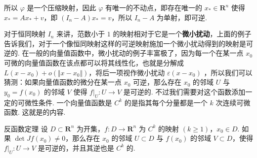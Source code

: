 所以 $\varphi$ 是一个压缩映射，因此 $\varphi$ 有唯一的不动点，即存在唯一的 $x_*\in \mathbf{R}^n$ 使得 $x_* = Ax_* + v$，即 $(I_n - A)x_* = v$，所以 $I_n - A$ 为单射，即可逆.

对于恒同映射 $I_n$ 来讲，范数小于 $1$ 的映射相对于它是一个\textbf{微小扰动}，上面的例子告诉我们，对于一个像恒同映射这样的可逆映射施加一个微小扰动得到的映射是可逆的. 在一般的向量值函数中，微小扰动的例子丰富极了，因为每一个在某一点 $x_0$ 可微的向量值函数在该点都可以将其线性化，也就是分解成 $L(x - x_0) + o(\Vert x - x_0\Vert)$，将后一项视作微小扰动 $\varepsilon(x - x_0)$ ，所以我们可以猜测：如果向量值函数的微分在某一点 $x_0$ 可逆，那么存在 $x_0$ 的邻域 $U$ 与 $y_0 = f(x_0)$ 的邻域 $V$ 使得 $f|_U \colon U\to V$ 是可逆的. 不过我们需要对这个函数添加一定的可微性条件. 一个向量值函数是 $C^k$ 的是指其每个分量都是一个 $k$ 次连续可微函数. 这就是的内容.

\begin{theorem}{反函数定理}{}
    设 $D\subset \mathbf{R}^n$ 为开集，$f\colon D\to\mathbf{R}^n$ 为 $C^{k}$ 的映射 $(k\geqslant 1)$，$x_0\in D$. 如果 $\det Jf(x_0)\neq 0$，那么存在 $x_0$ 的邻域 $U\subset D$ 与 $f(x_0)$ 的邻域 $V\subset D$，使得 $f|_U \colon U\to V$ 是可逆的，并且其逆也是 $C^k$ 的.
\end{theorem}

